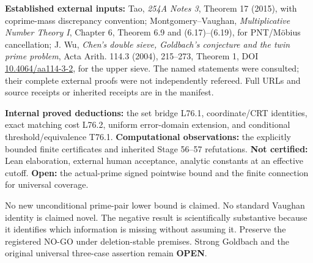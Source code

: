 \documentclass[11pt,a4paper]{article}
\begin{document}
\textbf{Established external inputs:} Tao, \emph{254A Notes 3}, Theorem 17 (2015), with coprime-mass discrepancy convention; Montgomery--Vaughan, \emph{Multiplicative Number Theory I}, Chapter 6, Theorem 6.9 and (6.17)--(6.19), for PNT/M\"obius cancellation; J. Wu, \emph{Chen's double sieve, Goldbach's conjecture and the twin prime problem}, Acta Arith. 114.3 (2004), 215--273, Theorem 1, DOI \href{https://doi.org/10.4064/aa114-3-2}{10.4064/aa114-3-2}, for the upper sieve. The named statements were consulted; their complete external proofs were not independently refereed. Full URLs and source receipts or inherited receipts are in the manifest.

\textbf{Internal proved deductions:} the set bridge L76.1, coordinate/CRT identities, exact matching cost L76.2, uniform error-domain extension, and conditional threshold/equivalence T76.1. \textbf{Computational observations:} the explicitly bounded finite certificates and inherited Stage 56--57 refutations. \textbf{Not certified:} Lean elaboration, external human acceptance, analytic constants at an effective cutoff. \textbf{Open:} the actual-prime signed pointwise bound and the finite connection for universal coverage.

No new unconditional prime-pair lower bound is claimed. No standard Vaughan identity is claimed novel. The negative result is scientifically substantive because it identifies which information is missing without assuming it. Preserve the registered NO-GO under deletion-stable premises. Strong Goldbach and the original universal three-case assertion remain \textbf{OPEN}.
\end{document}
